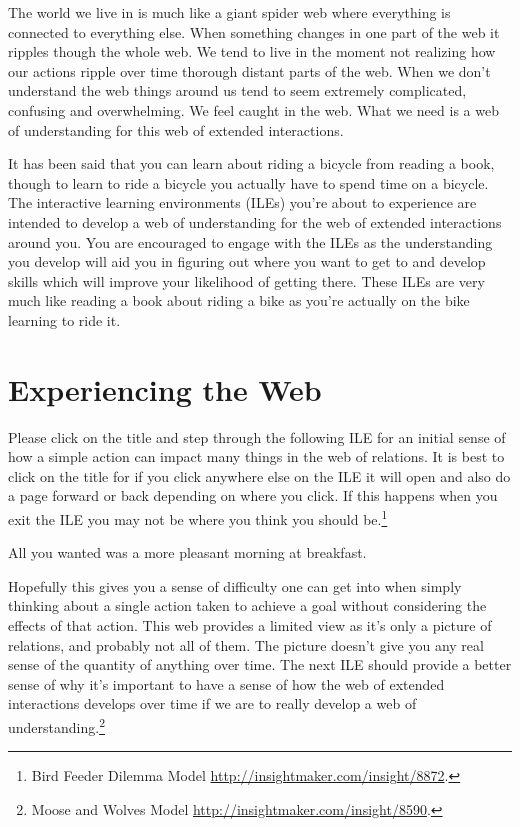 \documentclass[]{memoir}
\begin{document}
The world we live in is much like a giant spider web where everything is
connected to everything else. When something changes in one part of the
web it ripples though the whole web. We tend to live in the moment not
realizing how our actions ripple over time thorough distant parts of the
web. When we don't understand the web things around us tend to seem
extremely complicated, confusing and overwhelming. We feel caught in the
web. What we need is a web of understanding for this web of extended
interactions.

It has been said that you can learn about riding a bicycle from reading
a book, though to learn to ride a bicycle you actually have to spend
time on a bicycle. The interactive learning environments (ILEs) you're
about to experience are intended to develop a web of understanding for
the web of extended interactions around you. You are encouraged to
engage with the ILEs as the understanding you develop will aid you in
figuring out where you want to get to and develop skills which will
improve your likelihood of getting there. These ILEs are very much like
reading a book about riding a bike as you're actually on the bike
learning to ride it.

\section{Experiencing the Web}

Please click on the title and step through the following ILE for an
initial sense of how a simple action can impact many things in the web
of relations. It is best to click on the title for if you click anywhere
else on the ILE it will open and also do a page forward or back
depending on where you click. If this happens when you exit the ILE you
may not be where you think you should be.\footnote{Bird Feeder Dilemma
  Model \url{http://insightmaker.com/insight/8872}.}

\FloatBarrier 

\begin{model}[frametitle={Model: Bird Feeder Dilemma}] 

 All you wanted was a more pleasant morning at breakfast.




 \end{model}

Hopefully this gives you a sense of difficulty one can get into when
simply thinking about a single action taken to achieve a goal without
considering the effects of that action. This web provides a limited view
as it's only a picture of relations, and probably not all of them. The
picture doesn't give you any real sense of the quantity of anything over
time. The next ILE should provide a better sense of why it's important
to have a sense of how the web of extended interactions develops over
time if we are to really develop a web of understanding.\footnote{Moose
  and Wolves Model \url{http://insightmaker.com/insight/8590}.}
\end{document}
